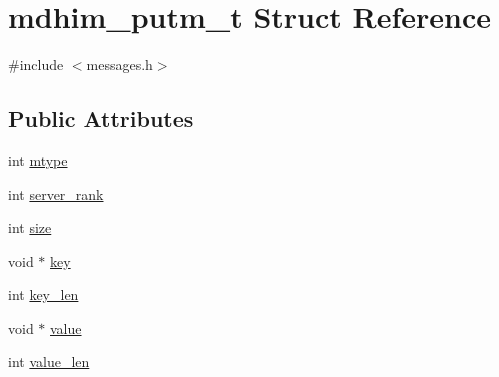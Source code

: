 \hypertarget{structmdhim__putm__t}{\section{mdhim\-\_\-putm\-\_\-t Struct Reference}
\label{structmdhim__putm__t}
}


{\ttfamily \#include $<$messages.\-h$>$}

\subsection*{Public Attributes}
\begin{DoxyCompactItemize}
\item 
int \hyperlink{structmdhim__putm__t_a632ccc930561029cfbbb28ec2b9929a4}{mtype}
\item 
int \hyperlink{structmdhim__putm__t_ad51fbdc39b6f3f8951b4e87a4f57e3bd}{server\-\_\-rank}
\item 
int \hyperlink{structmdhim__putm__t_aa12607649b47c8489b4a79039b69c629}{size}
\item 
void $\ast$ \hyperlink{structmdhim__putm__t_a6b5ee783b09f0039b09597e25005396e}{key}
\item 
int \hyperlink{structmdhim__putm__t_afbac7bbcd98d8489c502fbd6599964a0}{key\-\_\-len}
\item 
void $\ast$ \hyperlink{structmdhim__putm__t_adac45376bec0e989940d3a2b4a374daf}{value}
\item 
int \hyperlink{structmdhim__putm__t_af8cba256ae6e9003d55bc640c41f41e1}{value\-\_\-len}
\end{DoxyCompactItemize}


